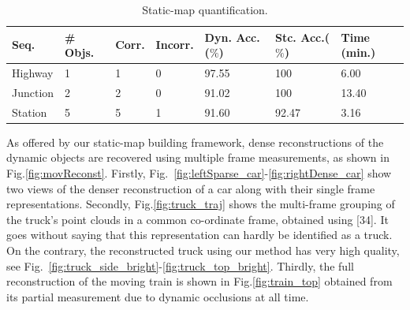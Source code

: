 \documentclass[10pt,twocolumn,letterpaper]{article}  %
\begin{document}
\begin{table}
\scriptsize
\begin{tabular}{|C{0.75cm}|C{0.9cm}|C{0.6cm}|C{0.6cm}|C{0.8cm}|C{0.8cm}|C{0.8cm}|}
\hline 
Seq. & \# Objs. & Corr. & Incorr. & Dyn. Acc.($\%$) & Stc. Acc.($\%$) & Time (min.) \tabularnewline
\hline 
\hline 
Highway & 1 & 1 & 0 & 97.55 &100 & 6.00\tabularnewline
\hline 
Junction & 2 & 2 & 0 & 91.02 &100 & 13.40\tabularnewline
\hline
Station & 5 & 5 & 1 & 91.60 &92.47 & 3.16 \tabularnewline
\hline 
\end{tabular}
\caption{Static-map quantification.}
\label{tab:static_map_quantification}
\vspace{-3mm}
\end{table}
As offered by our static-map building framework, dense reconstructions of the dynamic objects are recovered using multiple frame measurements, as shown in Fig.\ref{fig:movReconst}. Firstly, Fig.~\ref{fig:leftSparse_car}-\ref{fig:rightDense_car} show two views of the denser reconstruction of a car along with their single frame representations. Secondly, Fig.\ref{fig:truck_traj} shows the multi-frame grouping of the truck's point clouds in a common co-ordinate frame, obtained using [34]. It goes without saying that this representation can hardly be identified as a truck. On the contrary, the reconstructed truck using our method has very high quality, see Fig.~\ref{fig:truck_side_bright}-\ref{fig:truck_top_bright}. Thirdly, the full reconstruction of the moving train is shown in Fig.\ref{fig:train_top} obtained from its partial measurement due to dynamic occlusions at all time. 
\end{document}
